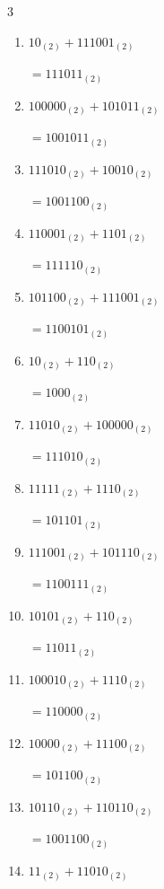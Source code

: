 \begin{multicols}{3}
\begin{enumerate}
        $=1000111_{(2)}$

  \item $10_{(2)} + 111001_{(2)}$

        $=111011_{(2)}$

  \item $100000_{(2)} + 101011_{(2)}$

        $=1001011_{(2)}$

  \item $111010_{(2)} + 10010_{(2)}$

        $=1001100_{(2)}$

  \item $110001_{(2)} + 1101_{(2)}$

        $=111110_{(2)}$

  \item $101100_{(2)} + 111001_{(2)}$

        $=1100101_{(2)}$

\columnbreak %

  \item $10_{(2)} + 110_{(2)}$

        $=1000_{(2)}$

  \item $11010_{(2)} + 100000_{(2)}$

        $=111010_{(2)}$

  \item $11111_{(2)} + 1110_{(2)}$

        $=101101_{(2)}$

  \item $111001_{(2)} + 101110_{(2)}$

        $=1100111_{(2)}$

  \item $10101_{(2)} + 110_{(2)}$

        $=11011_{(2)}$

  \item $100010_{(2)} + 1110_{(2)}$

        $=110000_{(2)}$

  \item $10000_{(2)} + 11100_{(2)}$

        $=101100_{(2)}$

  \item $10110_{(2)} + 110110_{(2)}$

        $=1001100_{(2)}$

  \item $11_{(2)} + 11010_{(2)}$


\end{enumerate}
\end{multicols}
